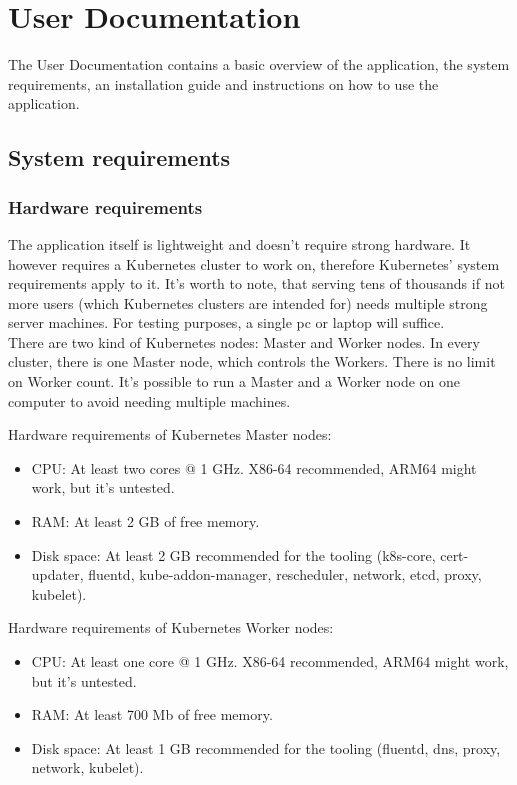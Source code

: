 \chapter{User Documentation} %
\label{ch:user}

The User Documentation contains a basic overview of the application, the system requirements, an installation guide and instructions on how to use the application.

\section{System requirements}
\subsection{Hardware requirements}
The application itself is lightweight and doesn't require strong hardware. It however requires a Kubernetes cluster to work on, therefore Kubernetes' system requirements apply to it. It's worth to note, that serving tens of thousands if not more users (which Kubernetes clusters are intended for) needs multiple strong server machines. For testing purposes, a single pc or laptop will suffice. \\

There are two kind of Kubernetes nodes: Master and Worker nodes. In every cluster, there is one Master node, which controls the Workers. There is no limit on Worker count. It's possible to run a Master and a Worker node on one computer to avoid needing multiple machines.
\bigbreak

\newpage
\noindent
Hardware requirements of Kubernetes Master nodes:
\begin{itemize}
	\item CPU: At least two cores @ 1 GHz. X86-64 recommended, ARM64 might work, but it's untested. 
	\item RAM: At least 2 GB of free memory.
	\item Disk space: At least 2 GB recommended for the tooling (k8s-core, cert-updater, fluentd, kube-addon-manager, rescheduler, network, etcd, proxy, kubelet).
\end{itemize}

\noindent
Hardware requirements of Kubernetes Worker nodes:
\begin{itemize}
	\item CPU: At least one core @ 1 GHz. X86-64 recommended, ARM64 might work, but it's untested. 
	\item RAM: At least 700 Mb of free memory.
	\item Disk space: At least 1 GB recommended for the tooling (fluentd, dns, proxy, network, kubelet).
\end{itemize}


